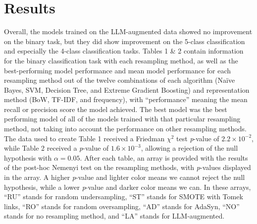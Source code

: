 \documentclass[runningheads]{llncs}
\begin{document}
{\parskip=0pt
\section{Results}
Overall, the models trained on the LLM-augmented data showed no improvement on the binary task, but they did show improvement on the 5-class classification and especially the 4-class classification tasks. Tables 1 \& 2 contain information for the binary classification task with each resampling method, as well as the best-performing model performance and mean model performance for each resampling method out of the twelve combinations of each algorithm (Naïve Bayes, SVM, Decision Tree, and Extreme Gradient Boosting) and representation method (BoW, TF-IDF, and frequency), with ``performance'' meaning the mean recall or precision score the model achieved. The best model was the best performing model of all of the models trained with that particular resampling method, not taking into account the performance on other resampling methods. The data used to create Table 1 received a Friedman $\chi^2$ test \emph{p}-value of $2.2 \times 10^{-2}$, while Table 2 received a \emph{p}-value of $1.6 \times 10^{-3}$, allowing a rejection of the null hypothesis with $\alpha=0.05$. After each table, an array is provided with the results of the post-hoc Nemenyi test on the resampling methods, with \emph{p}-values displayed in the array. A higher \emph{p}-value and lighter color means we cannot reject the null hypothesis, while a lower \emph{p}-value and darker color means we can. In these arrays, ``RU'' stands for random undersampling, ``ST'' stands for SMOTE with Tomek links, ``RO'' stands for random oversampling, ``AD'' stands for AdaSyn, ``NO'' stands for no resampling method, and ``LA'' stands for LLM-augmented.}
\end{document}
